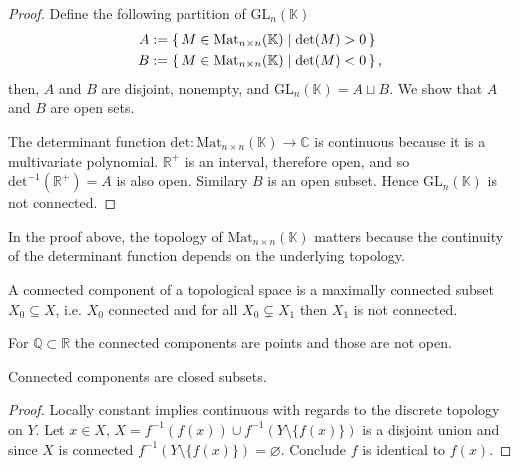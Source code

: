 %
\begin{proof}
    Define the following partition of \(\mathrm{GL}_n(\mathbb{K})\)
    \begin{align*}
        A &:= \left\{\, M \in \mathrm{Mat}_{n \times n}(\mathbb{K}) \mid \mathrm{det}(M) > 0 \,\right\} \\
        B &:= \left\{\, M \in \mathrm{Mat}_{n \times n}(\mathbb{K}) \mid \mathrm{det}(M) < 0 \,\right\} \text{,}
    \end{align*}
    then, \(A\) and \(B\) are disjoint, nonempty, and \(\mathrm{GL}_n(\mathbb{K}) = A \sqcup B\). We show that \(A\) and \(B\) are open sets.

    The determinant function \(\mathrm{det}: \mathrm{Mat}_{n \times n}(\mathbb{K}) \longrightarrow \mathbb{C}\) is continuous because it is a multivariate polynomial. \(\mathbb{R}^+\) is an interval, therefore open, and so \(\mathrm{det}^{-1}(\mathbb{R}^+) = A\) is also open. Similary \(B\) is an open subset. Hence \(\mathrm{GL}_n(\mathbb{K})\) is not connected.
\end{proof}
%
\begin{rembox}
    \begin{remark}
        In the proof above, the topology of \(\mathrm{Mat}_{n \times n}(\mathbb{K})\) matters because the continuity of the determinant function depends on the underlying topology.
    \end{remark}
\end{rembox}
%
\begin{defbox}
    \begin{definition}
        A connected component of a topological space is a maximally connected subset \(X_0 \subseteq X\), i.e. \(X_0\) connected and for all \(X_0 \subsetneq X_1\) then \(X_1\) is not connected.
    \end{definition}
\end{defbox}
%
\begin{example}
    For \(\mathbb{Q} \subset \mathbb{R}\) the connected components are points and those are not open.
\end{example}
%
\begin{thmbox}
    \begin{proposition}
        Connected components are closed subsets.
    \end{proposition}
\end{thmbox}
%

\begin{proof}
    Locally constant implies continuous with regards to the discrete topology on \(Y\). Let \(x \in X\), \(X = f^{-1}(f(x)) \cup f^{-1}(Y \setminus \{f(x)\})\) is a disjoint union and since \(X\) is connected \(f^{-1}(Y \setminus \{f(x)\}) = \varnothing\). Conclude \(f\) is identical to \(f(x)\).
\end{proof}

